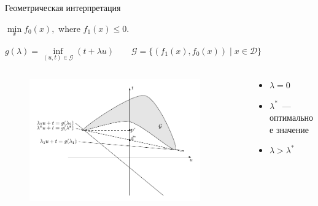 \documentclass[12pt]{beamer}
\begin{document}
\begin{frame}{Геометрическая интерпретация}
\begin{center}
$\min\limits_{x} f_0(x), \text{ where } f_1(x) \leq 0.$
\end{center}
$
g(\lambda) = \inf\limits_{(u, t) \in \mathcal{G}} (t + \lambda u) \qquad \mathcal{G} = \{ (f_1(x), f_0(x)) \; | \; x \in \mathcal{D} \}
$
\vspace{-10mm}
\begin{columns}
\begin{column}{0.6\textwidth}
\begin{figure}
\centering
\includegraphics[scale=0.7]{duality_geom.pdf}
\end{figure}
\end{column}
~
\begin{column}{0.4\textwidth}
\begin{itemize}
\item $\lambda = 0$
\item $\lambda^*$~--- оптимальное значение
\item $\lambda > \lambda^*$
\end{itemize}
\end{column}
\end{columns}

\end{frame}
\end{document}
